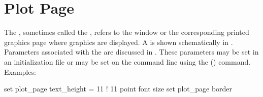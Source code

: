 \section{Plot Page}
\label{s:plot.page.def}

The , sometimes called the , refers to the window or the corresponding
printed graphics page where graphics are displayed. A  is shown schematically in
. Parameters associated with the  are discussed in
.  These parameters may be set in an initialization file or may be set on the \tao
command line using the  () command. Examples:
\begin{example}
  set plot_page text_height = 11  ! 11 point font size
  set plot_page border%
\end{example}

